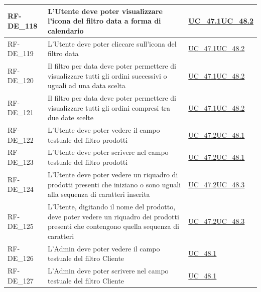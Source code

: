 \begin{longtable}{|>{\raggedright}p{}|>{\raggedright\arraybackslash}p{}|>{\raggedright\arraybackslash}p{}|}
	\hline
	RF-DE\_118 \hypertarget{rf-de_118} & L'Utente deve poter visualizzare l'icona del filtro data a forma di calendario & \hyperref[uc_47.1]{UC\_47.1}\newline \hyperref[uc_48.2]{UC\_48.2} \\
	\hline
	RF-DE\_119 \hypertarget{rf-de_119} & L'Utente deve poter cliccare sull'icona del filtro data & \hyperref[uc_47.1]{UC\_47.1}\newline \hyperref[uc_48.2]{UC\_48.2} \\
	\hline
	RF-DE\_120 \hypertarget{rf-de_120} & Il filtro per data deve poter permettere di visualizzare tutti gli ordini successivi o uguali ad una data scelta & \hyperref[uc_47.1]{UC\_47.1}\newline \hyperref[uc_48.2]{UC\_48.2} \\
	\hline
	RF-DE\_121 \hypertarget{rf-de_121} & Il filtro per data deve poter permettere di visualizzare tutti gli ordini compresi tra due date scelte & \hyperref[uc_47.1]{UC\_47.1}\newline \hyperref[uc_48.2]{UC\_48.2} \\
	\hline
	RF-DE\_122 \hypertarget{rf-de_122} & L'Utente deve poter vedere il campo testuale del filtro prodotti & \hyperref[uc_47.2]{UC\_47.2}\newline \hyperref[uc_48.1]{UC\_48.1} \\
	\hline
	RF-DE\_123 \hypertarget{rf-de_123} & L'Utente deve poter scrivere nel campo testuale del filtro prodotti & \hyperref[uc_47.2]{UC\_47.2}\newline \hyperref[uc_48.1]{UC\_48.1} \\
	\hline
	RF-DE\_124 \hypertarget{rf-de_124} & L'Utente deve poter vedere un riquadro di prodotti presenti che iniziano o sono uguali alla sequenza di caratteri inserita & \hyperref[uc_47.2]{UC\_47.2}\newline \hyperref[uc_48.3]{UC\_48.3} \\
	\hline
	RF-DE\_125 \hypertarget{rf-de_125} & L'Utente, digitando il nome del prodotto, deve poter vedere un riquadro dei prodotti presenti che contengono quella sequenza di caratteri & \hyperref[uc_47.2]{UC\_47.2}\newline \hyperref[uc_48.3]{UC\_48.3} \\
	\hline
	RF-DE\_126 \hypertarget{rf-de_126} & L'Admin deve poter vedere il campo testuale del filtro Cliente & \hyperref[uc_48.1]{UC\_48.1} \\
	\hline
	RF-DE\_127 \hypertarget{rf-de_127} & L'Admin deve poter scrivere nel campo testuale del filtro Cliente & \hyperref[uc_48.1]{UC\_48.1} \\

\end{longtable}
